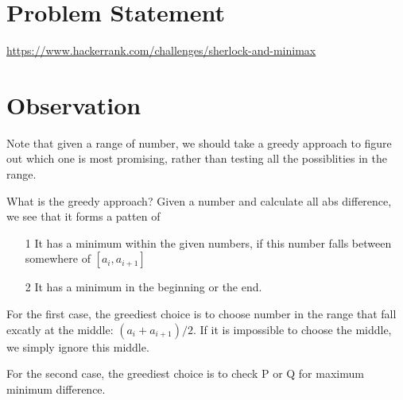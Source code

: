\documentclass{article}
\begin{document}
\section{Problem Statement}
\url{https://www.hackerrank.com/challenges/sherlock-and-minimax}

\section{Observation}
Note that given a range of number, 
we should take a greedy approach to figure out which 
one is most promising, rather than testing all the possiblities
in the range.

What is the greedy approach? Given a number and calculate
all abs difference, we see that it forms a patten of
\begin{itemize}
\item[1]
It has a minimum within the given
numbers, if this number falls between somewhere
of $[a_i, a_{i+1}]$
\item[2]
It has a minimum in the beginning or the end.
\end{itemize}

For the first case, the greediest choice is to choose
number in the range that fall excatly at the
middle: $(a_i + a_{i+1})/2$. If it is impossible
to choose the middle, we simply ignore this middle.

For the second case, the greediest choice is to 
check P or Q for maximum minimum difference.
\end{document}
